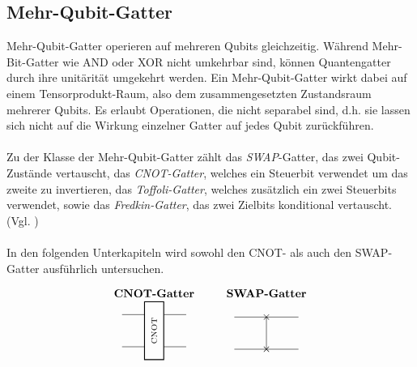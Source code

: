 \subsection{Mehr-Qubit-Gatter}
Mehr-Qubit-Gatter operieren auf mehreren Qubits gleichzeitig. Während Mehr-Bit-Gatter wie AND oder XOR nicht umkehrbar sind, können Quantengatter durch ihre unitärität umgekehrt werden. Ein Mehr-Qubit-Gatter wirkt dabei auf einem Tensorprodukt-Raum, also dem zusammengesetzten Zustandsraum mehrerer Qubits. Es erlaubt Operationen, die nicht separabel sind, d.h. sie lassen sich nicht auf die Wirkung einzelner Gatter auf jedes Qubit zurückführen.\\
\\
Zu der Klasse der Mehr-Qubit-Gatter zählt das \emph{SWAP}-Gatter, das zwei Qubit-Zustände vertauscht, das \emph{CNOT-Gatter}, welches ein Steuerbit verwendet um das zweite zu invertieren, das \emph{Toffoli-Gatter}, welches zusätzlich ein zwei Steuerbits verwendet, sowie das \emph{Fredkin-Gatter}, das zwei Zielbits konditional vertauscht. (Vgl. \cite[S.29, 156f.]{nielsen_quantum_2010})\\
\\
In den folgenden Unterkapiteln wird sowohl den CNOT- als auch den SWAP-Gatter ausführlich untersuchen.

\newcommand{\cnotbox}{%
  \tikz[baseline=-0.5ex]{
    \draw[-] (-1,0.5) -- (-0.3,0.5);
    \draw[-] (-1,-0.5) -- (-0.3,-0.5);
    \draw[thick] (-0.3,-0.9) rectangle (0.3,0.9);
    \node[rotate=90] at (0,0) {\(\scriptsize\text{CNOT}\)};
    \draw[-] (0.3,0.5) -- (1,0.5);
    \draw[-] (0.3,-0.5) -- (1,-0.5);
  }%
}

\newcommand{\swapgatter}{%
  \begin{tikzpicture}[baseline=(current bounding box.center)]
    \draw (-1,0.5) -- (1,0.5);
    \draw (-1,-0.5) -- (1,-0.5);
    \node at (0,0.5) {$\times$};
    \node at (0,-0.5) {$\times$};
    \draw (0,0.5) -- (0,-0.5);
  \end{tikzpicture}%
}

\[
\begin{array}{c@{\hspace{1cm}}c}
\textbf{CNOT-Gatter} & \textbf{SWAP-Gatter}\\
\cnotbox & \swapgatter
\end{array}
\]

